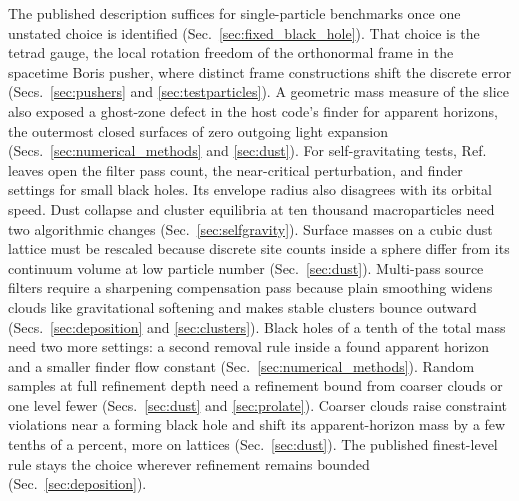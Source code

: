 The published description suffices for single-particle benchmarks once one unstated choice is identified (Sec.~\ref{sec:fixed_black_hole}). That choice is the tetrad gauge, the local rotation freedom of the orthonormal frame in the spacetime Boris pusher, where distinct frame constructions shift the discrete error (Secs.~\ref{sec:pushers} and \ref{sec:testparticles}). A geometric mass measure of the slice also exposed a ghost-zone defect in the host code's finder for apparent horizons, the outermost closed surfaces of zero outgoing light expansion (Secs.~\ref{sec:numerical_methods} and \ref{sec:dust}). For self-gravitating tests, Ref.~\cite{Wu:2026nrpic} leaves open the filter pass count, the near-critical perturbation, and finder settings for small black holes. Its envelope radius also disagrees with its orbital speed. Dust collapse and cluster equilibria at ten thousand macroparticles need two algorithmic changes (Sec.~\ref{sec:selfgravity}). Surface masses on a cubic dust lattice must be rescaled because discrete site counts inside a sphere differ from its continuum volume at low particle number (Sec.~\ref{sec:dust}). Multi-pass source filters require a sharpening compensation pass \cite{1991ppcs.book.....B} because plain smoothing widens clouds like gravitational softening and makes stable clusters bounce outward (Secs.~\ref{sec:deposition} and \ref{sec:clusters}). Black holes of a tenth of the total mass need two more settings: a second removal rule inside a found apparent horizon and a smaller finder flow constant (Sec.~\ref{sec:numerical_methods}). Random samples at full refinement depth need a refinement bound from coarser clouds or one level fewer (Secs.~\ref{sec:dust} and \ref{sec:prolate}). Coarser clouds raise constraint violations near a forming black hole and shift its apparent-horizon mass by a few tenths of a percent, more on lattices (Sec.~\ref{sec:dust}). The published finest-level rule stays the choice wherever refinement remains bounded (Sec.~\ref{sec:deposition}).

